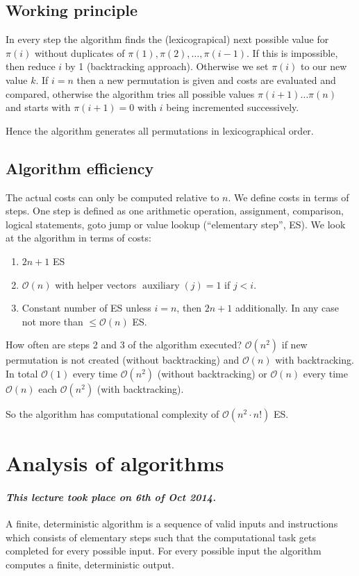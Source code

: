 \documentclass[a4paper]{article}
\theoremstyle{definition}
\newcommand{\dateref}[1]{\paragraph{\textit{This lecture took place on #1.}}}
\begin{document}
\subsection{Working principle}
%
In every step the algorithm finds the (lexicograpical) next possible value for $\pi(i)$ without duplicates of $\pi(1), \pi(2), \ldots, \pi(i-1)$. If this is impossible, then reduce $i$ by 1 (backtracking approach). Otherwise we set $\pi(i)$ to our new value $k$. If $i = n$ then a new permutation is given and costs are evaluated and compared, otherwise the algorithm tries all possible values $\pi(i+1)\ldots \pi(n)$ and starts with $\pi(i+1) = 0$ with $i$ being incremented successively.

Hence the algorithm generates all permutations in lexicographical order.

\subsection{Algorithm efficiency}
%
The actual costs can only be computed relative to $n$. We define costs in terms of steps. One step is defined as one arithmetic operation, assignment, comparison, logical statements, goto jump or value lookup (``elementary step'', ES). We look at the algorithm in terms of costs:

\begin{enumerate}
  \item $2n + 1$ ES
  \item $\mathcal{O}(n)$ with helper vectors $\operatorname{auxiliary}(j) = 1$ if $j < i$.
  \item Constant number of ES unless $i=n$, then $2n + 1$ additionally. In any case not more than $\leq \mathcal{O}(n)$ ES.
\end{enumerate}

How often are steps 2 and 3 of the algorithm executed? $\mathcal{O}(n^2)$ if new permutation is not created (without backtracking) and $\mathcal{O}(n)$ with backtracking. In total $\mathcal{O}(1)$ every time $\mathcal{O}(n^2)$ (without backtracking) or $\mathcal{O}(n)$ every time $\mathcal{O}(n)$ each $\mathcal{O}(n^2)$ (with backtracking).

So the algorithm has computational complexity of $\mathcal{O}(n^2 \cdot n!)$ ES.

\section{Analysis of algorithms}
\dateref{6th of Oct 2014}
%
A finite, deterministic algorithm is a sequence of valid inputs and instructions which consists of elementary steps such that the computational task gets completed for every possible input. For every possible input the algorithm computes a finite, deterministic output.
\end{document}
